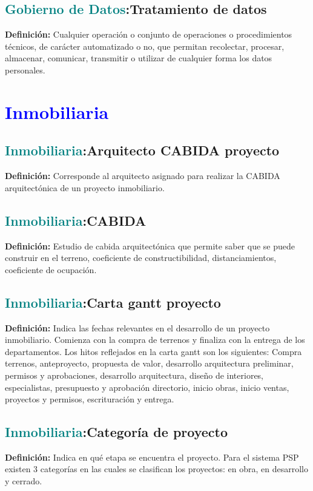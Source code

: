 \documentclass[12pt]{article}
\begin{document}
\subsection{\textcolor{teal}{Gobierno de Datos}:{Tratamiento de datos}}
\textbf{Definición:} Cualquier operación o conjunto de operaciones o procedimientos técnicos, de carácter automatizado o no, que permitan recolectar, procesar, almacenar, comunicar, transmitir o utilizar de cualquier forma los datos personales.
\section{\textcolor{blue}{Inmobiliaria}}
\subsection{\textcolor{teal}{Inmobiliaria}:{Arquitecto CABIDA proyecto}}
\textbf{Definición:} Corresponde al arquitecto asignado para realizar la CABIDA arquitectónica de un proyecto inmobiliario.
\subsection{\textcolor{teal}{Inmobiliaria}:{CABIDA}}
\textbf{Definición:} Estudio de cabida arquitectónica que permite saber que se puede construir en el terreno, coeficiente de constructibilidad, distanciamientos, coeficiente de ocupación.
\subsection{\textcolor{teal}{Inmobiliaria}:{Carta gantt proyecto}}
\textbf{Definición:} Indica las fechas relevantes en el desarrollo de un proyecto inmobiliario. Comienza con la compra de terrenos y finaliza con la entrega de los departamentos. Los hitos reflejados en la carta gantt son los siguientes: Compra terrenos, anteproyecto, propuesta de valor, desarrollo arquitectura preliminar, permisos y aprobaciones, desarrollo arquitectura, diseño de interiores, especialistas, presupuesto y aprobación directorio, inicio obras, inicio ventas, proyectos y permisos, escrituración y entrega. 
\subsection{\textcolor{teal}{Inmobiliaria}:{Categoría de proyecto}}
\textbf{Definición:} Indica en qué etapa se encuentra el proyecto. Para el sistema PSP existen 3 categorías en las cuales se clasifican los proyectos: en obra, en desarrollo y cerrado.
\end{document}
